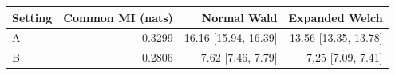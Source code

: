 \begin{tabular}{@{}lrrr@{}}
\toprule
Setting & Common MI (nats) & Normal Wald & Expanded Welch\\
\midrule
A & 0.3299 & 16.16 [15.94, 16.39] & 13.56 [13.35, 13.78]\\
B & 0.2806 & 7.62 [7.46, 7.79] & 7.25 [7.09, 7.41]\\
\bottomrule
\end{tabular}
